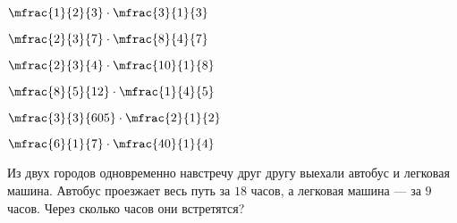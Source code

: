 \begin{homework}[number=2]
\begin{listofex}
\begin{enumcols}[columns=3]
			\item \(\mfrac{1}{2}{3}\cdot\mfrac{3}{1}{3} \)
			\item \(\mfrac{2}{3}{7}\cdot\mfrac{8}{4}{7} \)
			\item \( \mfrac{2}{3}{4}\cdot\mfrac{10}{1}{8}\)
			\item \( \mfrac{8}{5}{12}\cdot\mfrac{1}{4}{5}\)
			\item \( \mfrac{3}{3}{605}\cdot\mfrac{2}{1}{2} \)
			\item \( \mfrac{6}{1}{7}\cdot\mfrac{40}{1}{4}\)
		\end{enumcols}
	\item Из двух городов одновременно навстречу друг другу выехали автобус и легковая
	машина. Автобус проезжает весь путь за \( 18 \) часов, а легковая машина --- за \( 9 \) часов. Через сколько часов они встретятся?
	\end{listofex}
\end{homework}
%	
%	
%
%
